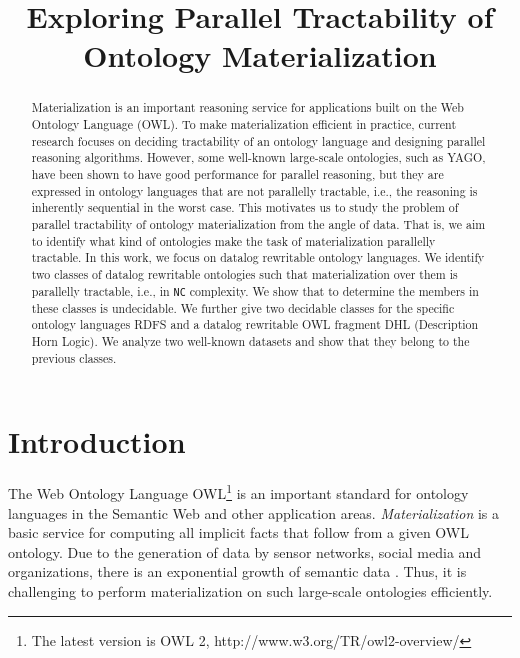 \documentclass{article}
\title{Exploring Parallel Tractability of Ontology Materialization}
\begin{document}
\maketitle
\newtheorem{lemma}{Lemma}
\newtheorem{theorem}{Theorem}
\newtheorem{problem}{Problem}
\newtheorem{property}{Property}
\newtheorem{definition}{Definition}
\newtheorem{invariant}{Invariant}
\newtheorem{example}{Example}
\newtheorem{remark}{Remark}
\newtheorem{corollary}{Corollary}

\begin{abstract}
Materialization is an important reasoning service for applications built on the Web Ontology Language (OWL). To make materialization efficient in practice, current research focuses on deciding tractability of an ontology language and designing parallel reasoning algorithms. However, some well-known large-scale ontologies, such as YAGO, have been shown to have good performance for parallel reasoning, but they are expressed in ontology languages that are not parallelly tractable, i.e., the reasoning is inherently sequential in the worst case. This motivates us to study the problem of parallel tractability of ontology materialization from the angle of data. That is, we aim to identify what kind of ontologies make the task of materialization parallelly tractable. In this work, we focus on datalog rewritable ontology languages. We identify two classes of datalog rewritable ontologies such that materialization over them is parallelly tractable, i.e., in \texttt{NC} complexity. We show that to determine the members in these classes is undecidable. We further give two decidable classes for the specific ontology languages RDFS and a datalog rewritable OWL fragment DHL (Description Horn Logic). We analyze two well-known datasets and show that they belong to the previous classes.
\end{abstract}



\section{Introduction}
The Web Ontology Language OWL\footnote{The latest version is OWL 2, http://www.w3.org/TR/owl2-overview/} is an important standard for ontology languages in the Semantic Web and other application areas. \emph{Materialization} is a basic service for computing all implicit facts that follow from a given OWL ontology. Due to the generation of data by sensor networks, social media and organizations, there is an exponential growth of semantic data \cite{DBLP:conf/wims/MeuselBP15}. Thus, it is challenging to perform materialization on such large-scale ontologies efficiently.
\end{document}
